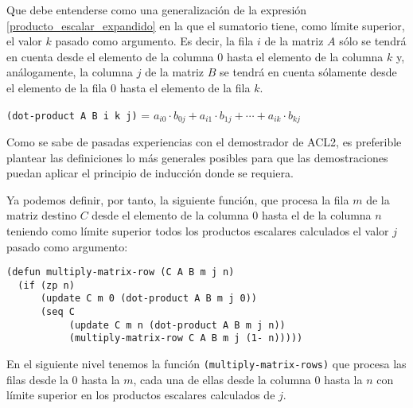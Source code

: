 \documentclass[a4paper,10pt]{article}
\begin{document}
\par \vspace{10pt}

Que debe entenderse como una generalización de la expresión \ref{producto_escalar_expandido} en la que el sumatorio tiene, como límite superior, el valor $k$ pasado como argumento. Es decir, la fila $i$ de la matriz $A$ sólo se tendrá en cuenta desde el elemento de la columna 0 hasta el elemento de la columna $k$ y, análogamente, la columna $j$ de la matriz $B$ se tendrá en cuenta sólamente desde el elemento de la fila 0 hasta el elemento de la fila $k$.

\par \vspace{10pt}

\begin{center}
\texttt{(dot-product A B i k j)} = $a_{i0}\cdot b_{0j} + a_{i1}\cdot b_{1j} + \cdots + a_{ik}\cdot b_{kj}$
\end{center}

\par \vspace{10pt}

Como se sabe de pasadas experiencias con el demostrador de ACL2, es preferible plantear las definiciones lo más generales posibles para que las demostraciones puedan aplicar el principio de inducción donde se requiera.

\par \vspace{10pt}

Ya podemos definir, por tanto, la siguiente función, que procesa la fila $m$ de la matriz destino $C$ desde el elemento de la columna 0 hasta el de la columna $n$ teniendo como límite superior todos los productos escalares calculados el valor $j$ pasado como argumento:

\par \vspace{10pt}

\begin{lstlisting}[language=clips]
(defun multiply-matrix-row (C A B m j n)
  (if (zp n)
      (update C m 0 (dot-product A B m j 0))
      (seq C
           (update C m n (dot-product A B m j n))
           (multiply-matrix-row C A B m j (1- n)))))
\end{lstlisting}

\par \vspace{10pt}

En el siguiente nivel tenemos la función \texttt{(multiply-matrix-rows)} que procesa las filas desde la 0 hasta la $m$, cada una de ellas desde la columna 0 hasta la $n$ con límite superior en los productos escalares calculados de $j$. 
\end{document}
